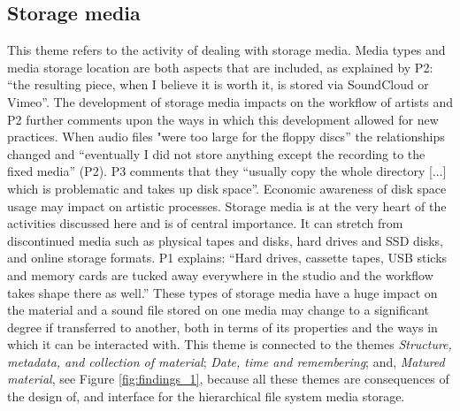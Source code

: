 \documentclass[runningheads,a4paper]{cmmr2023}
\begin{document}
\subsection{Storage media}
\label{sec:storage}
This theme refers to the activity of dealing with storage media. Media types and media storage location are both aspects that are included, as explained by P2: “the resulting piece, when I believe it is worth it, is stored via SoundCloud or Vimeo”. The development of storage media impacts on the workflow of artists and P2 further comments upon the ways in which this development allowed for new practices. When audio files "were too large for the floppy discs” the relationships changed and “eventually I did not store anything except the recording to the fixed media” (P2). P3 comments that they “usually copy the whole directory [...] which is problematic and takes up disk space”. Economic awareness of disk space usage may impact on artistic processes. Storage media is at the very heart of the activities discussed here and is of central importance. It can stretch from discontinued media such as physical tapes and disks, hard drives and SSD disks, and online storage formats. P1 explains: “Hard drives, cassette tapes, USB sticks and memory cards are tucked away everywhere in the studio and the workflow takes shape there as well.” These types of storage media have a huge impact on the material and a sound file stored on one media may change to a significant degree if transferred to another, both in terms of its properties and the ways in which it can be interacted with. This theme is connected to the themes \emph{Structure, metadata, and collection of material}; \emph{Date, time and remembering}; and, \emph{Matured material}, see Figure \ref{fig:findings_1}, because all these themes are consequences of the design of, and interface for the hierarchical file system media storage.

\end{document}
